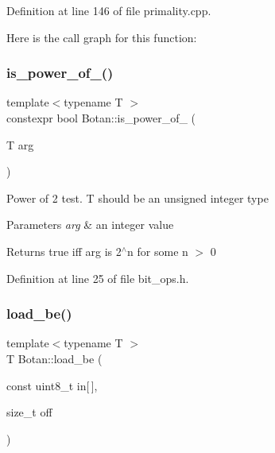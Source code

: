 Definition at line 146 of file primality.\+cpp.

Here is the call graph for this function\+:
\mbox{\label{namespace_botan_aeab1f8b408a2ea772778740017bddcd5}} 
\subsubsection{\texorpdfstring{is\+\_\+power\+\_\+of\+\_()}{is\_power\_of\_2()}}
{\footnotesize\ttfamily template$<$typename T $>$ \\
constexpr bool Botan\+::is\+\_\+power\+\_\+of\+\_ (\begin{DoxyParamCaption}\item[{T}]{arg }\end{DoxyParamCaption})\hspace{0.3cm}{\ttfamily [inline]}}

Power of 2 test. T should be an unsigned integer type 
\begin{DoxyParams}{Parameters}
{\em arg} & an integer value \\
\hline
\end{DoxyParams}
\begin{DoxyReturn}{Returns}
true iff arg is 2$^\wedge$n for some n $>$ 0 
\end{DoxyReturn}


Definition at line 25 of file bit\+\_\+ops.\+h.

\mbox{\label{namespace_botan_a640029f085cc0a904b32e20f42303dd2}} 
\subsubsection{\texorpdfstring{load\+\_\+be()}{load\_be()}\hspace{0.1cm}{\footnotesize\ttfamily [1/5]}}
{\footnotesize\ttfamily template$<$typename T $>$ \\
T Botan\+::load\+\_\+be (\begin{DoxyParamCaption}\item[{const uint8\+\_\+t}]{in\mbox{[}$\,$\mbox{]},  }\item[{size\+\_\+t}]{off }\end{DoxyParamCaption})\hspace{0.3cm}{\ttfamily [inline]}}

